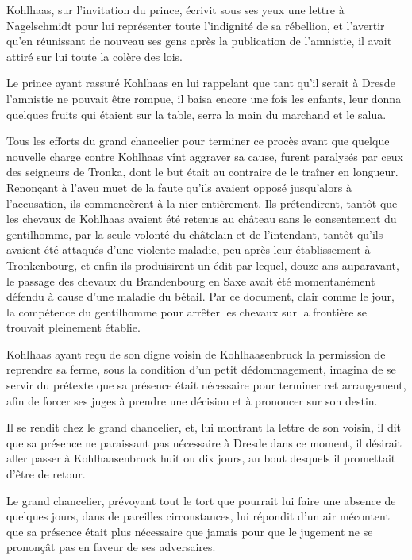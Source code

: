 \documentclass[french,twoside]{book} %
\begin{document}
Kohlhaas, sur l’invitation du prince, écrivit sous ses yeux une lettre à Nagelschmidt pour lui représenter toute l’indignité de sa rébellion, et l’avertir qu’en réunissant de nouveau ses gens après la publication de l’amnistie, il avait attiré sur lui toute la colère des lois.\par
Le prince ayant rassuré Kohlhaas en lui rappelant que tant qu’il serait à Dresde l’amnistie ne pouvait être rompue, il baisa encore une fois les enfants, leur donna quelques fruits qui étaient sur la table, serra la main du marchand et le salua.\par
Tous les efforts du grand chancelier pour terminer ce procès avant que quelque nouvelle charge contre Kohlhaas vînt aggraver sa cause, furent paralysés par ceux des seigneurs de Tronka, dont le but était au contraire de le traîner en longueur. Renonçant à l’aveu muet de la faute qu’ils avaient opposé jusqu’alors à l’accusation, ils commencèrent à la nier entièrement. Ils prétendirent, tantôt que les chevaux de Kohlhaas avaient été retenus au château sans le consentement du gentilhomme, par la seule volonté du châtelain et de l’intendant, tantôt qu’ils avaient été attaqués d’une violente maladie, peu après leur établissement à Tronkenbourg, et enfin ils produisirent un édit par lequel, douze ans auparavant, le passage des chevaux du Brandenbourg en Saxe avait été momentanément défendu à cause d’une maladie du bétail. Par ce document, clair comme le jour, la compétence du gentilhomme pour arrêter les chevaux sur la frontière se trouvait pleinement établie.\par
Kohlhaas ayant reçu de son digne voisin de Kohlhaasenbruck la permission de reprendre sa ferme, sous la condition d’un petit dédommagement, imagina de se servir du prétexte que sa présence était nécessaire pour terminer cet arrangement, afin de forcer ses juges à prendre une décision et à prononcer sur son destin.\par
Il se rendit chez le grand chancelier, et, lui montrant la lettre de son voisin, il dit que sa présence ne paraissant pas nécessaire à Dresde dans ce moment, il désirait aller passer à Kohlhaasenbruck huit ou dix jours, au bout desquels il promettait d’être de retour.\par
Le grand chancelier, prévoyant tout le tort que pourrait lui faire une absence de quelques jours, dans de pareilles circonstances, lui répondit d’un air mécontent que sa présence était plus nécessaire que jamais pour que le jugement ne se prononçât pas en faveur de ses adversaires.\par
\end{document}
